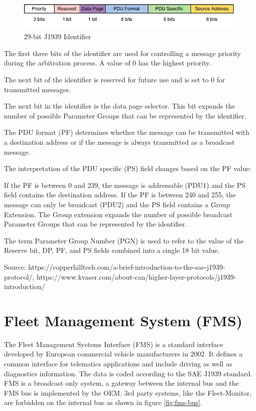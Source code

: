 \begin{figure}[h!]
	\centering
	\includegraphics[height=1.5cm]{images/j1939-identifier}
	\caption{29-bit J1939 Identifier}
	\vspace{-1.4ex}
	\label{fig:29-bit_J1939_Identifier}
\end{figure}

The first three bits of the identifier are used for controlling a message priority during the arbitration process. A value of 0 has the highest priority.

The next bit of the identifier is reserved for future use and is set to 0 for transmitted messages.

The next bit in the identifier is the data page selector. This bit expands the number of possible Parameter Groups that can be represented by the identifier.

The PDU format (PF) determines whether the message can be transmitted with a destination address or if the message is always transmitted as a broadcast message.

The interpretation of the PDU specific (PS) field changes based on the PF value:

If the PF is between 0 and 239, the message is addressable (PDU1) and the PS field contains the destination address.
If the PF is between 240 and 255, the message can only be broadcast (PDU2) and the PS field contains a Group Extension.
The Group extension expands the number of possible broadcast Parameter Groups that can be represented by the identifier.

The term Parameter Group Number (PGN) is used to refer to the value of the Reserve bit, DP, PF, and PS fields combined into a single 18 bit value.

Source: https://copperhilltech.com/a-brief-introduction-to-the-sae-j1939-protocol/,
https://www.kvaser.com/about-can/higher-layer-protocols/j1939-introduction/
\newpage

\section{Fleet Management System (FMS)}
The Fleet Management Systems Interface (FMS) is a standard interface developed by European commercial vehicle manufacturers in 2002. It defines a common interface for telematics applications and include driving as well as diagnostics information. The data is coded according to the SAE J1939 standard. FMS is a broadcast only system, a gateway between the internal bus and the FMS bus is implemented by the OEM. 3rd party systems, like the Fleet-Monitor, are forbidden on the internal bus as shown in figure \ref{fig:fms-bus}. 

